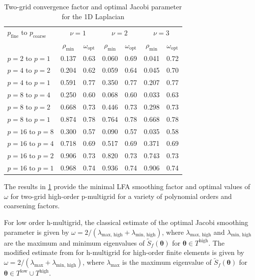 \documentclass[review]{siamart190516}
\begin{document}
\begin{table}[ht!]
\begin{center}
\begin{tabular}{l cc cc cc}
  \toprule
  $p_{\text{fine}}$ to $p_{\text{coarse}}$  &  \multicolumn{2}{c}{$\nu = 1$}  &  \multicolumn{2}{c}{$\nu = 2$}  &  \multicolumn{2}{c}{$\nu = 3$}  \\
                       &  $\rho_{\min}$ & $\omega_{\text{opt}}$  &  $\rho_{\min}$ & $\omega_{\text{opt}}$  &  $\rho_{\min}$ & $\omega_{\text{opt}}$  \\
  \toprule
  $p = 2$ to $p = 1$   &  0.137 & 0.63  &  0.060 & 0.69  &  0.041 & 0.72   \\
  \midrule
  $p = 4$ to $p = 2$   &  0.204 & 0.62  &  0.059 & 0.64  &  0.045 & 0.70   \\
  $p = 4$ to $p = 1$   &  0.591 & 0.77  &  0.350 & 0.77  &  0.207 & 0.77   \\
  \midrule
  $p = 8$ to $p = 4$   &  0.250 & 0.60  &  0.068 & 0.60  &  0.033 & 0.63   \\
  $p = 8$ to $p = 2$   &  0.668 & 0.73  &  0.446 & 0.73  &  0.298 & 0.73   \\
  $p = 8$ to $p = 1$   &  0.874 & 0.78  &  0.764 & 0.78  &  0.668 & 0.78   \\
  \midrule
  $p = 16$ to $p = 8$  &  0.300 & 0.57  &  0.090 & 0.57  &  0.035 & 0.58   \\
  $p = 16$ to $p = 4$  &  0.718 & 0.69  &  0.517 & 0.69  &  0.371 & 0.69   \\
  $p = 16$ to $p = 2$  &  0.906 & 0.73  &  0.820 & 0.73  &  0.743 & 0.73   \\
  $p = 16$ to $p = 1$  &  0.968 & 0.74  &  0.936 & 0.74  &  0.906 & 0.74   \\
  \bottomrule
\end{tabular}
\end{center}
\caption{Two-grid convergence factor and optimal Jacobi parameter for the 1D Laplacian}
\label{table:two_grid_1d}
\end{table}

The results in \cref{table:two_grid_1d} provide the minimal LFA smoothing factor and optimal values of $\omega$ for two-grid high-order p-multigrid for a variety of polynomial orders and coarsening factors.

For low order h-multigrid, the classical estimate of the optimal Jacobi smoothing parameter is given by $\omega = 2 / \left( \lambda_{\text{max, high}} + \lambda_{\text{min, high}} \right)$, where $\lambda_{\text{max, high}}$ and $\lambda_{\text{min, high}}$ are the maximum and minimum eigenvalues of $\tilde{S}_f \left( \boldsymbol{\theta} \right)$ for $\boldsymbol{\theta} \in T^{\text{high}}$.
The modified estimate from \cite{he2020two} for h-multigrid for high-order finite elements is given by $\omega = 2 / \left( \lambda_{\text{max}} + \lambda_{\text{min, high}} \right)$, where $\lambda_{\text{max}}$ is the maximum eigenvalue of $\tilde{S}_f \left( \boldsymbol{\theta} \right)$ for $\boldsymbol{\theta} \in T^{\text{low}} \cup T^{\text{high}}$.
\end{document}
